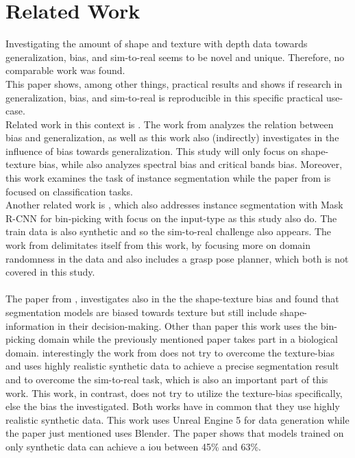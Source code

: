 	\clearpage
	\section{Related Work}
	\label{sec:related-work}
		Investigating the amount of shape and texture with depth data towards generalization, bias, and sim-to-real seems to be novel and unique. Therefore, no comparable work was found. \\
		This paper shows, among other things, practical results and shows if research in generalization, bias, and sim-to-real is reproducible in this specific practical use-case.\\
		Related work in this context is  \cite{Gavrikov2024}. The work from \citeauthor{Gavrikov2024} analyzes the relation between bias and generalization, as well as this work also (indirectly) investigates in the influence of bias towards generalization. This study will only focus on shape-texture bias, while  also analyzes spectral bias and critical bands bias. Moreover, this work examines the task of instance segmentation while the paper from \citeauthor{Gavrikov2024} is focused on classification tasks.\\
		Another related work is  \cite{Raj2023}, which also addresses instance segmentation with Mask R-CNN for bin-picking with focus on the input-type as this study also do. The train data is also synthetic and so the sim-to-real challenge also appears. The work from \citeauthor{Raj2023} delimitates itself from this work, by focusing more on domain randomness in the data and also includes a grasp pose planner, which both is not covered in this study.\\
		\\
		The paper  from \citeauthor{Tabak2023} \cite{Tabak2023}, investigates also in the the shape-texture bias and found that segmentation models are biased towards texture but still include shape-information in their decision-making. Other than paper \cite{Tabak2023} this work uses the bin-picking domain while the previously mentioned paper takes part in a biological domain. interestingly the work from \citeauthor{Tabak2023} does not try to overcome the texture-bias and uses highly realistic synthetic data to achieve a precise segmentation result and to overcome the sim-to-real task, which is also an important part of this work. This work, in contrast, does not try to utilize the texture-bias specifically, else the bias the investigated. Both works have in common that they use highly realistic synthetic data. This work uses Unreal Engine 5 for data generation while the paper just mentioned uses Blender. The paper shows that models trained on only synthetic data can achieve a \ac{iou} between 45\% and 63\%.\\
